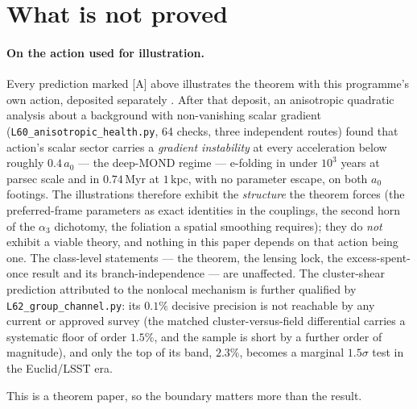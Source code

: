 \documentclass[11pt,letterpaper]{article}
\begin{document}
\section{What is not proved}\label{sec:notproved}

\paragraph{On the action used for illustration.} Every prediction marked [A] above illustrates the theorem
with this programme's own action, deposited separately \cite{Zimmerman2026paper8}. After that deposit, an
anisotropic quadratic analysis about a background with non-vanishing scalar gradient
(\texttt{L60\_anisotropic\_health.py}, 64 checks, three independent routes) found that action's scalar sector
carries a \emph{gradient instability} at every acceleration below roughly $0.4\,a_0$ --- the deep-MOND regime
--- e-folding in under $10^3$ years at parsec scale and in $0.74$\,Myr at $1$\,kpc, with no parameter escape,
on both $a_0$ footings. The illustrations therefore exhibit the \emph{structure} the theorem forces (the
preferred-frame parameters as exact identities in the couplings, the second horn of the $\alpha_3$ dichotomy,
the foliation a spatial smoothing requires); they do \emph{not} exhibit a viable theory, and nothing in this
paper depends on that action being one. The class-level statements --- the theorem, the lensing lock, the
excess-spent-once result and its branch-independence --- are unaffected. The cluster-shear prediction
attributed to the nonlocal mechanism is further qualified by \texttt{L62\_group\_channel.py}: its $0.1\%$
decisive precision is not reachable by any current or approved survey (the matched cluster-versus-field
differential carries a systematic floor of order $1.5\%$, and the sample is short by a further order of
magnitude), and only the top of its band, $2.3\%$, becomes a marginal $1.5\sigma$ test in the Euclid/LSST era.

This is a theorem paper, so the boundary matters more than the result.
\end{document}
